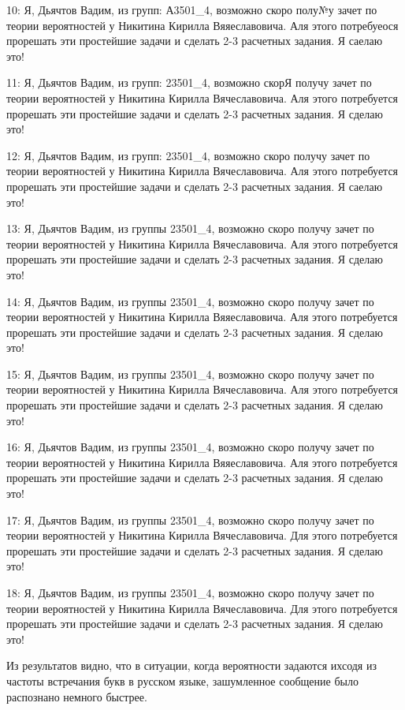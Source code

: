 {10: Я, Дьячтов Вадим, из групп: А3501\_4, возможно скоро полу№у зачет по теории вероятностей у Никитина Кирилла Вяяеславовича. Аля этого потребуеося прорешать эти простейшие задачи и сделать 2-3 расчетных задания. Я саелаю это!

11: Я, Дьячтов Вадим, из групп: 23501\_4, возможно скорЯ получу зачет по теории вероятностей у Никитина Кирилла Вячеславовича. Аля этого потребуется прорешать эти простейшие задачи и сделать 2-3 расчетных задания. Я сделаю это!

12: Я, Дьячтов Вадим, из групп: 23501\_4, возможно скоро получу зачет по теории вероятностей у Никитина Кирилла Вячеславовича. Аля этого потребуется прорешать эти простейшие задачи и сделать 2-3 расчетных задания. Я саелаю это!

13: Я, Дьячтов Вадим, из группы 23501\_4, возможно скоро получу зачет по теории вероятностей у Никитина Кирилла Вячеславовича. Аля этого потребуется прорешать эти простейшие задачи и сделать 2-3 расчетных задания. Я сделаю это!

14: Я, Дьячтов Вадим, из группы 23501\_4, возможно скоро получу зачет по теории вероятностей у Никитина Кирилла Вяяеславовича. Аля этого потребуется прорешать эти простейшие задачи и сделать 2-3 расчетных задания. Я сделаю это!

15: Я, Дьячтов Вадим, из группы 23501\_4, возможно скоро получу зачет по теории вероятностей у Никитина Кирилла Вячеславовича. Аля этого потребуется прорешать эти простейшие задачи и сделать 2-3 расчетных задания. Я сделаю это!

16: Я, Дьячтов Вадим, из группы 23501\_4, возможно скоро получу зачет по теории вероятностей у Никитина Кирилла Вяяеславовича. Аля этого потребуется прорешать эти простейшие задачи и сделать 2-3 расчетных задания. Я сделаю это!

17: Я, Дьячтов Вадим, из группы 23501\_4, возможно скоро получу зачет по теории вероятностей у Никитина Кирилла Вячеславовича. Для этого потребуется прорешать эти простейшие задачи и сделать 2-3 расчетных задания. Я сделаю это!

18: Я, Дьячтов Вадим, из группы 23501\_4, возможно скоро получу зачет по теории вероятностей у Никитина Кирилла Вячеславовича. Для этого потребуется прорешать эти простейшие задачи и сделать 2-3 расчетных задания. Я сделаю это!

}
\vspace{0.5cm}

Из результатов видно, что в ситуации, когда вероятности задаются ихсодя из частоты встречания букв в русском языке, зашумленное сообщение было распознано немного быстрее.

